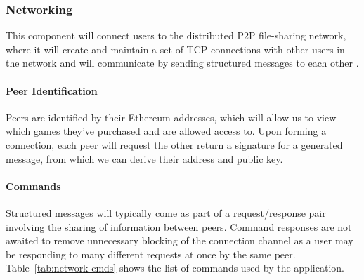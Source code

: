 \subsubsection{Networking}\label{subsubsec:networking}

This component will connect users to the distributed P2P file-sharing network, where it will create and maintain a set of TCP connections with other users  in the network and will communicate by sending structured messages to each other .

\paragraph*{Peer Identification}
Peers are identified by their Ethereum addresses, which will allow us to view which games they've purchased and are allowed access to. Upon forming a connection, each peer will request the other return a signature for a generated message, from which we can derive their address and public key.

\paragraph*{Commands}\label{subsubsec:commands}

Structured messages  will typically come as part of a request/response pair involving the sharing of information between peers. Command responses are not awaited to remove unnecessary blocking of the connection channel as a user may be responding to many different requests at once by the same peer. 
\x
Table~\ref{tab:network-cmds} shows the list of commands used by the application.

